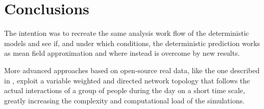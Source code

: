 \documentclass[DIV=12, BCOR=0pt]{scrartcl}  %
\begin{document}
	
	\section{Conclusions}
	The intention was to recreate the same analysis work flow of the deterministic models and see if, and under which conditions, the deterministic prediction works as mean field approximation and where instead is overcome by new results. 

	More advanced approaches based on open-source real data, like the one described in \citet{Firth2020}, exploit a variable weighted and directed network topology that follows the actual interactions of a group of people during the day on a short time scale, greatly increasing the complexity and computational load of the simulations.


 
%		
	\clearpage
	\small
	
\end{document}
